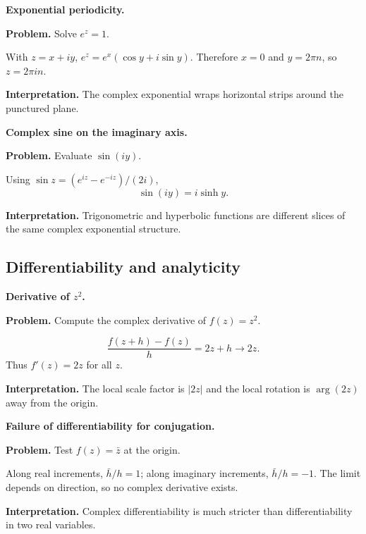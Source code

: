 \begin{workedexample}
\textbf{Exponential periodicity.}\par
\textbf{Problem.} Solve $e^z=1$.
\begin{solution}
With $z=x+iy$, $e^z=e^x(\cos y+i\sin y)$. Therefore $x=0$ and $y=2\pi n$, so $z=2\pi in$.

\textbf{Interpretation.} The complex exponential wraps horizontal strips around the punctured plane.
\end{solution}
\end{workedexample}

\begin{workedexample}
\textbf{Complex sine on the imaginary axis.}\par
\textbf{Problem.} Evaluate $\sin(iy)$.
\begin{solution}
Using $\sin z=(e^{iz}-e^{-iz})/(2i)$,
\[
\sin(iy)=i\sinh y.
\]

\textbf{Interpretation.} Trigonometric and hyperbolic functions are different slices of the same complex exponential structure.
\end{solution}
\end{workedexample}

\subsection{Differentiability and analyticity}

\begin{workedexample}
\textbf{Derivative of $z^2$.}\par
\textbf{Problem.} Compute the complex derivative of $f(z)=z^2$.
\begin{solution}
\[
\frac{f(z+h)-f(z)}{h}=2z+h\longrightarrow2z.
\]
Thus $f'(z)=2z$ for all $z$.

\textbf{Interpretation.} The local scale factor is $|2z|$ and the local rotation is $\arg(2z)$ away from the origin.
\end{solution}
\end{workedexample}

\begin{workedexample}
\textbf{Failure of differentiability for conjugation.}\par
\textbf{Problem.} Test $f(z)=\bar z$ at the origin.
\begin{solution}
Along real increments, $\bar h/h=1$; along imaginary increments, $\bar h/h=-1$. The limit depends on direction, so no complex derivative exists.

\textbf{Interpretation.} Complex differentiability is much stricter than differentiability in two real variables.
\end{solution}
\end{workedexample}


